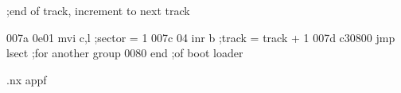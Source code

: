                                   ;end of track, increment to next track

007a 0e01                                   mvi  c,l               ;sector = 1
007c 04                                     inr  b                 ;track = track + 1
007d c30800                                 jmp  lsect             ;for another group
0080                                        end                    ;of boot loader


.nx appf
